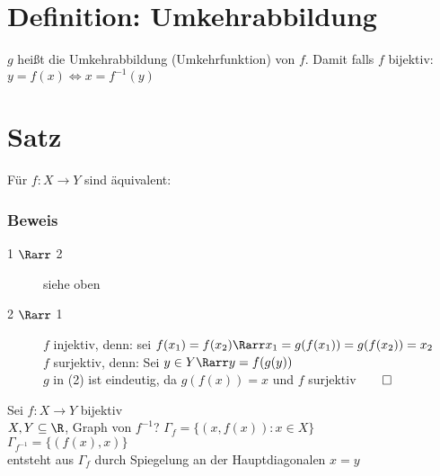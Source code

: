 \section{Definition: Umkehrabbildung}
$g$ heißt die Umkehrabbildung (Umkehrfunktion) von $f$. 
Damit falls $f$ bijektiv: $y = f(x) \Leftrightarrow x = f^{-1}(y)$
\section{Satz}
Für $f: X\to Y$ sind äquivalent:
\subsubsection*{Beweis}
\begin{description}
\item[1 $\Rarr$ 2] siehe oben
\item[2 $\Rarr$ 1] $f$ injektiv, denn: sei $f(x_1) = f(x_2) \Rarr x_1 = g(f(x_1)) = g(f(x_2)) = x_2$\\
$f$ surjektiv, denn: Sei $y \in Y \Rarr y = f(g(y))$\\
$g$ in (2) ist eindeutig, da $g(f(x)) = x$ und $f$ surjektiv$\qed$
\end{description}
Sei $f:X\to Y$ bijektiv\\
$X, Y \subseteq \R$, Graph von $f^{-1}$?
$\Gamma_f = \{(x, f(x)): x \in X\}$\\
$\Gamma_{f^{-1}} = \{(f(x), x)\}$\\
entsteht aus $\Gamma_f$ durch Spiegelung an der Hauptdiagonalen $x = y$\\

